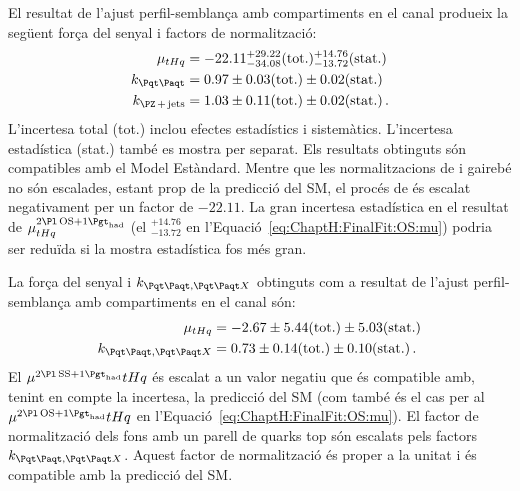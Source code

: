 El resultat de l'ajust perfil-semblança amb compartiments en el canal \dilepOStau produeix la següent força del senyal i factors de normalització:
\begin{align}
\mu_{\tHq} &= -22.11^{+29.22}_{-34.08} (\text{tot.}) ^{+14.76}_{-13.72} (\text{stat.})\label{eq:resum:FinalFit:OS:mu} \\
k_{\ttbar} &= 0.97 \pm 0.03 (\text{tot.}) \pm 0.02 (\text{stat.}) \label{eq:resum:FinalFit:OS:ktt}\\
k_{\Zjets} &= 1.03 \pm 0.11 (\text{tot.}) \pm 0.02 (\text{stat.}) \label{eq:resum:FinalFit:OS:zjets}\, .
\end{align}
L'incertesa total (tot.) inclou efectes estadístics i sistemàtics. L'incertesa estadística (stat.) també es mostra per separat. Els resultats obtinguts són compatibles amb el Model Estàndard. Mentre que les normalitzacions de \ttbar i \Zjets gairebé no són escalades, estant prop de la predicció del SM, el procés de \tHq és escalat negativament per un factor de $-22.11$. La gran incertesa estadística en el resultat de $\mu^{\dilepOStau}_{\tHq}$ (el $^{+14.76}_{-13.72}$ en l'Equació~\ref{eq:ChaptH:FinalFit:OS:mu}) podria ser reduïda si la mostra estadística fos més gran.

La força del senyal i $k_{\ttbar,\ttX}$ obtinguts com a resultat de l'ajust perfil-semblança amb compartiments en el canal \dilepSStau són:
\begin{align}
\mu_{\tHq} &= -2.67 \pm 5.44 (\text{tot.}) \pm 5.03 (\text{stat.}) \label{eq:resum:FinalFit:SS:mu} \\
k_{\ttbar,\ttX} &= 0.73 \pm 0.14 (\text{tot.}) \pm 0.10 (\text{stat.}) \label{eq:resum:FinalFit:SS:ktt} \, .\
\end{align}
El $\mu^{\dilepSStau}{\tHq}$ és escalat a un valor negatiu que és compatible amb, tenint en compte la incertesa, la predicció del SM (com també és el cas per al $\mu^{\dilepOStau}{\tHq}$ en l'Equació~\ref{eq:ChaptH:FinalFit:OS:mu}). El factor de normalització dels fons amb un parell de quarks top són escalats pels factors $k_{\ttbar,\ttX}$. Aquest factor de normalització és proper a la unitat i és compatible amb la predicció del SM.


